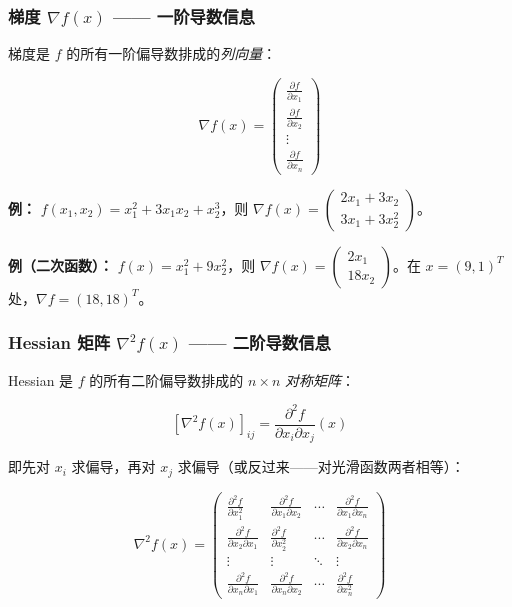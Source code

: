 \subsubsection{梯度 $\nabla f(x)$ —— 一阶导数信息}

梯度是 $f$ 的所有一阶偏导数排成的\emph{列向量}：

\[
\nabla f(x) = \begin{pmatrix}
\frac{\partial f}{\partial x_1} \\
\frac{\partial f}{\partial x_2} \\
\vdots \\
\frac{\partial f}{\partial x_n}
\end{pmatrix}
\]

\textbf{例：} $f(x_1,x_2)=x_1^2+3x_1x_2+x_2^3$，则 $\nabla f(x)=\begin{pmatrix}2x_1+3x_2 \\ 3x_1+3x_2^2\end{pmatrix}$。

\textbf{例（二次函数）：} $f(x)=x_1^2+9x_2^2$，则 $\nabla f(x)=\begin{pmatrix}2x_1 \\ 18x_2\end{pmatrix}$。在 $x=(9,1)^T$ 处，$\nabla f=(18,18)^T$。

\subsubsection{Hessian 矩阵 $\nabla^2 f(x)$ —— 二阶导数信息}

Hessian 是 $f$ 的所有二阶偏导数排成的 $n\times n$ \emph{对称矩阵}：

\[
[\nabla^2 f(x)]_{ij} = \frac{\partial^2 f}{\partial x_i \partial x_j}(x)
\]

即先对 $x_i$ 求偏导，再对 $x_j$ 求偏导（或反过来——对光滑函数两者相等）：

\[
\nabla^2 f(x) = \begin{pmatrix}
\frac{\partial^2 f}{\partial x_1^2} & \frac{\partial^2 f}{\partial x_1\partial x_2} & \cdots & \frac{\partial^2 f}{\partial x_1\partial x_n} \\[4pt]
\frac{\partial^2 f}{\partial x_2\partial x_1} & \frac{\partial^2 f}{\partial x_2^2} & \cdots & \frac{\partial^2 f}{\partial x_2\partial x_n} \\
\vdots & \vdots & \ddots & \vdots \\
\frac{\partial^2 f}{\partial x_n\partial x_1} & \frac{\partial^2 f}{\partial x_n\partial x_2} & \cdots & \frac{\partial^2 f}{\partial x_n^2}
\end{pmatrix}
\]

